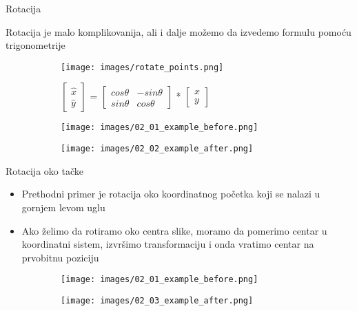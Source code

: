 \documentclass[bookmarks=true,bookmarksopen=true,pdfborder={0 0 0},pdfhighlight={/N},linkbordercolor={.5 .5 .5},implicit=false,unicode,xcolor={table}]{beamer}
\begin{document}
\begin{frame}{Rotacija}

  Rotacija je malo komplikovanija, ali i dalje možemo da izvedemo formulu pomoću trigonometrije
  \begin{figure}
    \begin{subfigure}{3cm}
      \texttt{[image: images/rotate\_points.png]}
    \end{subfigure}
    \hfill
    \begin{subfigure}{6cm}
      $\begin{bmatrix}
        \hat{x}\\
        \hat{y}
        \end{bmatrix}$
      =
      $\begin{bmatrix}
        cos\theta & -sin\theta\\
        sin\theta & cos\theta
        \end{bmatrix}$
      *
      $\begin{bmatrix}
        x\\
        y
        \end{bmatrix}$
    \end{subfigure}
  \end{figure}
  
  \begin{figure}
    \begin{subfigure}{5cm}
      \texttt{[image: images/02\_01\_example\_before.png]}
    \end{subfigure}
    \begin{subfigure}{5cm}
      \texttt{[image: images/02\_02\_example\_after.png]}
    \end{subfigure}
  \end{figure}

\end{frame}

\begin{frame}{Rotacija oko tačke}

  \begin{itemize}
    \item Prethodni primer je rotacija oko koordinatnog početka koji se nalazi u gornjem levom uglu
    \item Ako želimo da rotiramo oko centra slike, moramo da pomerimo centar u koordinatni sistem,
          izvršimo transformaciju i onda vratimo centar na prvobitnu poziciju
  \end{itemize}
  
  \begin{figure}
    \begin{subfigure}{5cm}
      \texttt{[image: images/02\_01\_example\_before.png]}
    \end{subfigure}
    \begin{subfigure}{5cm}
      \texttt{[image: images/02\_03\_example\_after.png]}
    \end{subfigure}
  \end{figure}

\end{frame}
\end{document}

